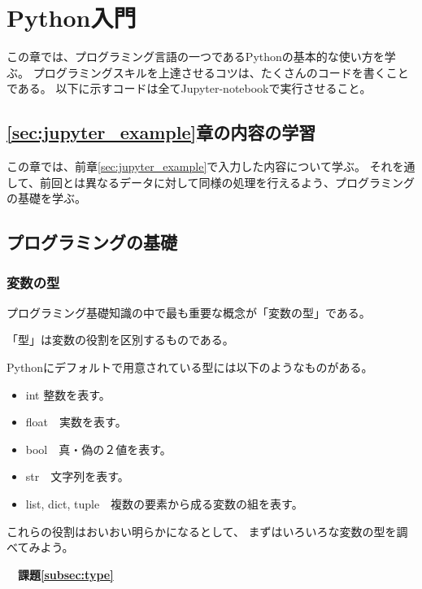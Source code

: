 \chapter{Python入門}

この章では、プログラミング言語の一つであるPythonの基本的な使い方を学ぶ。
プログラミングスキルを上達させるコツは、たくさんのコードを書くことである。
以下に示すコードは全てJupyter-notebookで実行させること。





\section{\ref{sec:jupyter_example}章の内容の学習}

この章では、前章\ref{sec:jupyter_example}で入力した内容について学ぶ。
それを通して、前回とは異なるデータに対して同様の処理を行えるよう、プログラミングの基礎を学ぶ。



\section{プログラミングの基礎}

\subsection{変数の型\label{subsec:type}}

プログラミング基礎知識の中で最も重要な概念が「変数の型」である。

「型」は変数の役割を区別するものである。

Pythonにデフォルトで用意されている型には以下のようなものがある。
\begin{itemize}
	\item {\ttfamily int} 整数を表す。
	\item {\ttfamily float}　実数を表す。
	\item {\ttfamily bool}　真・偽の２値を表す。
	\item {\ttfamily str}　文字列を表す。
	\item {\ttfamily list, dict, tuple}　複数の要素から成る変数の組を表す。
\end{itemize}

これらの役割はおいおい明らかになるとして、
まずはいろいろな変数の型を調べてみよう。


{\bfseries　課題\ref{subsec:type}}

